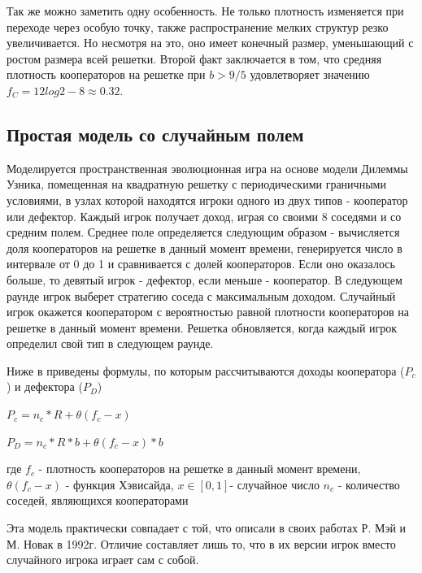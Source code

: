 \documentclass[12pt,a4paper]{article}
\begin{document}
	\par Так же можно заметить одну особенность. Не только плотность изменяется при  переходе через особую точку, также распространение мелких структур резко увеличивается. Но несмотря на это, оно имеет конечный размер, уменьшающий с ростом размера всей решетки. Второй факт заключается в том, что средняя плотность кооператоров на решетке при $b>9/5$ удовлетворяет значению $ f_{C} = 12log2-8 \approx 0.32$.
	
	\subsection{Простая модель со случайным полем}
	
	\par Моделируется пространственная эволюционная игра на основе модели
	Дилеммы Узника, помещенная на квадратную решетку с периодическими граничными
	условиями, в узлах которой находятся игроки одного из двух типов - кооператор 
	или дефектор. Каждый игрок получает доход, играя со своими 8 соседями и со средним полем. Среднее поле определяется следующим образом - вычисляется доля кооператоров на решетке в данный момент времени, генерируется число в интервале от 0 до 1 и сравнивается с долей кооператоров. Если оно оказалось больше, то девятый игрок - дефектор, если меньше - кооператор. В следующем раунде игрок выберет стратегию соседа с максимальным доходом. Случайный игрок окажется кооператором с вероятностью
	равной плотности кооператоров на решетке в данный момент времени. Решетка 
	обновляется, когда каждый игрок определил свой тип в следующем раунде.
	
	\par Ниже в приведены формулы, по которым рассчитываются доходы кооператора ($P_{c}$) и дефектора ($P_{D}$)
	
	$ P_{c}= n_{c}*R+ \theta(f_{c}-x) $
	
	$ P_{D}= n_{c}*R*b+ \theta(f_{c}-x)*b $
	
	где $ f_{c}$ - плотность кооператоров на решетке в данный момент
	времени, $\theta(f_{c}-x)$ - функция Хэвисайда, $x \in [0,1]$- случайное число
	$n_{c}$ - количество соседей, являющихся кооператорами
	 
	
	\par Эта модель практически совпадает с той, что описали в своих работах Р. Мэй и
	М. Новак в 1992г. Отличие составляет лишь то, что в их версии игрок вместо случайного
	игрока играет сам с собой.
	
\end{document}
